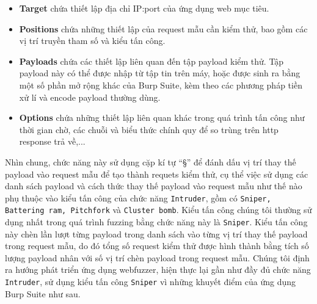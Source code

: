 \begin{itemize}
    \item \textbf{Target} chứa thiết lập địa chỉ IP:port của ứng dụng web mục tiêu.
    \item \textbf{Positions} chứa những thiết lập của request mẫu cần kiểm thử, bao gồm các vị trí truyền tham số và kiểu tấn công.
    \item \textbf{Payloads} chứa các thiết lập liên quan đến tập payload kiểm thử. Tập payload này có thể được nhập từ tập tin trên máy, hoặc được sinh ra bằng một số phần mở rộng khác của Burp Suite, kèm theo các phương pháp tiền xử lí và encode payload thường dùng.
    \item \textbf{Options} chứa những thiết lập liên quan khác trong quá trình tấn công như thời gian chờ, các chuỗi và biểu thức chính quy để so trùng trên \acrshort{http} response trả về,...
\end{itemize}
Nhìn chung, chức năng này sử dụng cặp kí tự ``§'' để đánh dấu vị trí thay thế payload vào request mẫu để tạo thành requets kiểm thử, cụ thể việc sử dụng các danh sách payload và cách thức thay thế payload vào request mẫu như thế nào phụ thuộc vào kiểu tấn công của chức năng \texttt{Intruder}, gồm có \texttt{Sniper, Battering ram, Pitchfork} và \texttt{Cluster bomb}. Kiểu tấn công chúng tôi thường sử dụng nhất trong quá trình fuzzing bằng chức năng này là \texttt{Sniper}. Kiểu tấn công này chèn lần lượt từng payload trong danh sách vào từng vị trí thay thế payload trong request mẫu, do đó tổng số request kiểm thử được hình thành bằng tích số lượng payload nhân với số vị trí chèn payload trong request mẫu. Chúng tôi định ra hướng phát triển ứng dụng webfuzzer, hiện thực lại gần như đầy đủ chức năng \texttt{Intruder}, sử dụng kiểu tấn công \texttt{Sniper} vì những khuyết điểm của ứng dụng Burp Suite như sau.
